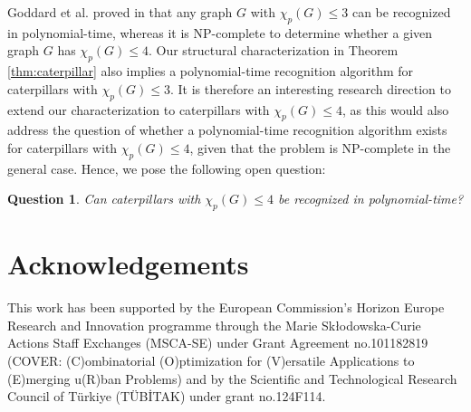\documentclass{article}
\newtheorem{question}{Question}
\begin{document}
  Goddard et al. proved in \cite{goddard2008broadcast} that any graph $G$ with $\chi_p(G) \le 3$ can be recognized in polynomial-time, whereas it is NP-complete to determine whether a given graph $G$ has $\chi_p(G) \le 4$. Our structural characterization in Theorem \ref{thm:caterpillar}  also implies a polynomial-time recognition algorithm for caterpillars with $\chi_p(G) \le 3$. It is therefore an interesting research direction to extend our characterization to caterpillars with $\chi_p(G) \le 4$, as this would also address the question of whether a polynomial-time recognition algorithm exists for caterpillars with $\chi_p(G) \le 4$, given that the problem is NP-complete in the general case. Hence, we pose the following open question:

  \begin{question}
      Can caterpillars with $\chi_p(G) \le 4$ be recognized in polynomial-time?
  \end{question}

\section*{Acknowledgements}
This work has been supported by the European Commission's Horizon Europe Research and Innovation programme through the Marie Skłodowska-Curie Actions Staff Exchanges (MSCA-SE) under Grant Agreement no.101182819 (COVER: (C)ombinatorial (O)ptimization for (V)ersatile Applications to (E)merging u(R)ban Problems) and by the Scientific and Technological Research Council of Türkiye (TÜBİTAK) under grant no.124F114.
\end{document}
